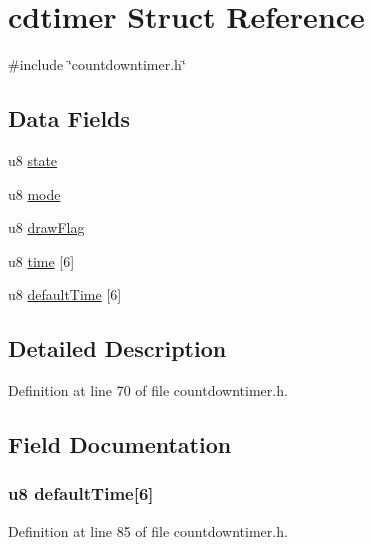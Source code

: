 \hypertarget{structcdtimer}{\section{cdtimer \-Struct \-Reference}
\label{structcdtimer}
}


{\ttfamily \#include \char`\"{}countdowntimer.\-h\char`\"{}}

\subsection*{\-Data \-Fields}
\begin{DoxyCompactItemize}
\item 
u8 \hyperlink{structcdtimer_ad0bc4e4e6e6ffc52d9079b73afd73887}{state}
\item 
u8 \hyperlink{structcdtimer_a7cea6ae40aa46b41e3806213a39718c6}{mode}
\item 
u8 \hyperlink{structcdtimer_a3e8544bc695992c4f9df78288018341b}{draw\-Flag}
\item 
u8 \hyperlink{structcdtimer_a423004d470464f425592df7a003cd838}{time} \mbox{[}6\mbox{]}
\item 
u8 \hyperlink{structcdtimer_ae19e9af02a2f14bdabf817ce07d11037}{default\-Time} \mbox{[}6\mbox{]}
\end{DoxyCompactItemize}


\subsection{\-Detailed \-Description}


\-Definition at line 70 of file countdowntimer.\-h.



\subsection{\-Field \-Documentation}
\hypertarget{structcdtimer_ae19e9af02a2f14bdabf817ce07d11037}{
\subsubsection[{default\-Time}]{\setlength{\rightskip}{0pt plus 5cm}u8 {\bf default\-Time}\mbox{[}6\mbox{]}}}\label{structcdtimer_ae19e9af02a2f14bdabf817ce07d11037}


\-Definition at line 85 of file countdowntimer.\-h.


